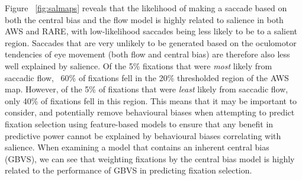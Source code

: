 Figure ~\ref{fig:salmaps} reveals that the likelihood of making a saccade based on both the central bias and the flow model is highly related to salience in both AWS and RARE, with low-likelihood saccades being less likely to be to a salient region. Saccades that are very unlikely to be generated based on the oculomotor tendencies of eye movement (both flow and central bias) are therefore also less well explained by salience. Of the 5\% fixations that were \textit{most} likely from saccadic flow, ~60\% of fixations fell in the 20\% thresholded region of the AWS map. However, of the 5\% of fixations that were \textit{least} likely from saccadic flow, only 40\% of fixations fell in this region. This means that it may be important to consider, and potentially remove behavioural biases when attempting to predict fixation selection using feature-based models to ensure that any benefit in predictive power cannot be explained by behavioural biases correlating with salience. When examining a model that contains an inherent central bias (GBVS), we can see that weighting fixations by the \citet{clarke-tatler2014} central bias model is highly related to the performance of GBVS in predicting fixation selection.


